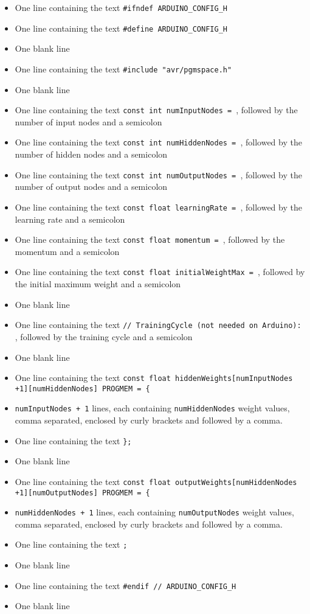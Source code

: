 \documentclass[a4paper]{article}
\begin{document}
\begin{itemize}
\item One line containing the text \lstinline{#ifndef ARDUINO_CONFIG_H}
\item One line containing the text \lstinline{#define ARDUINO_CONFIG_H}
\item One blank line
\item One line containing the text \lstinline{#include "avr/pgmspace.h"}
\item One blank line
\item One line containing the text \lstinline{const int numInputNodes = }, followed by the number of input nodes and a semicolon
\item One line containing the text \lstinline{const int numHiddenNodes = }, followed by the number of hidden nodes and a semicolon
\item One line containing the text \lstinline{const int numOutputNodes = }, followed by the number of output nodes and a semicolon
\item One line containing the text \lstinline{const float learningRate = }, followed by the learning rate and a semicolon
\item One line containing the text \lstinline{const float momentum = }, followed by the momentum and a semicolon
\item One line containing the text \lstinline{const float initialWeightMax = }, followed by the initial maximum weight and a semicolon
\item One blank line
\item One line containing the text \lstinline{// TrainingCycle (not needed on Arduino): }, followed by the training cycle and a semicolon
\item One blank line
\item One line containing the text \lstinline|const float hiddenWeights[numInputNodes +1][numHiddenNodes] PROGMEM = {|
\item \lstinline{numInputNodes + 1} lines, each containing \lstinline{numHiddenNodes} weight values, comma separated, enclosed by curly brackets and followed by a comma.
\item One line containing the text \lstinline|};|
\item One blank line
\item One line containing the text \lstinline|const float outputWeights[numHiddenNodes +1][numOutputNodes] PROGMEM = {|
\item \lstinline{numHiddenNodes + 1} lines, each containing \lstinline{numOutputNodes} weight values, comma separated, enclosed by curly brackets and followed by a comma.
\item One line containing the text \lstinline|;|
\item One blank line
\item One line containing the text \lstinline{#endif // ARDUINO_CONFIG_H}
\item One blank line
\end{itemize}
\end{document}
